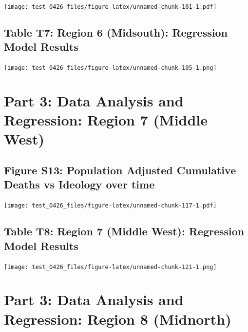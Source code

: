 \documentclass[
]{article}
\begin{document}
\texttt{[image: test\_0426\_files/figure-latex/unnamed-chunk-101-1.pdf]}

\hypertarget{table-t7-region-6-midsouth-regression-model-results}{%
\subsection{Table T7: Region 6 (Midsouth): Regression Model
Results}\label{table-t7-region-6-midsouth-regression-model-results}}

\texttt{[image: test\_0426\_files/figure-latex/unnamed-chunk-105-1.png]}

\newpage

\hypertarget{part-3-data-analysis-and-regression-region-7-middle-west}{%
\section{Part 3: Data Analysis and Regression: Region 7 (Middle
West)}\label{part-3-data-analysis-and-regression-region-7-middle-west}}

\hypertarget{figure-s13-population-adjusted-cumulative-deaths-vs-ideology-over-time}{%
\subsection{Figure S13: Population Adjusted Cumulative Deaths vs
Ideology over
time}\label{figure-s13-population-adjusted-cumulative-deaths-vs-ideology-over-time}}

\texttt{[image: test\_0426\_files/figure-latex/unnamed-chunk-117-1.pdf]}

\hypertarget{table-t8-region-7-middle-west-regression-model-results}{%
\subsection{Table T8: Region 7 (Middle West): Regression Model
Results}\label{table-t8-region-7-middle-west-regression-model-results}}

\texttt{[image: test\_0426\_files/figure-latex/unnamed-chunk-121-1.png]}

\newpage

\hypertarget{part-3-data-analysis-and-regression-region-8-midnorth}{%
\section{Part 3: Data Analysis and Regression: Region 8
(Midnorth)}\label{part-3-data-analysis-and-regression-region-8-midnorth}}
\end{document}
